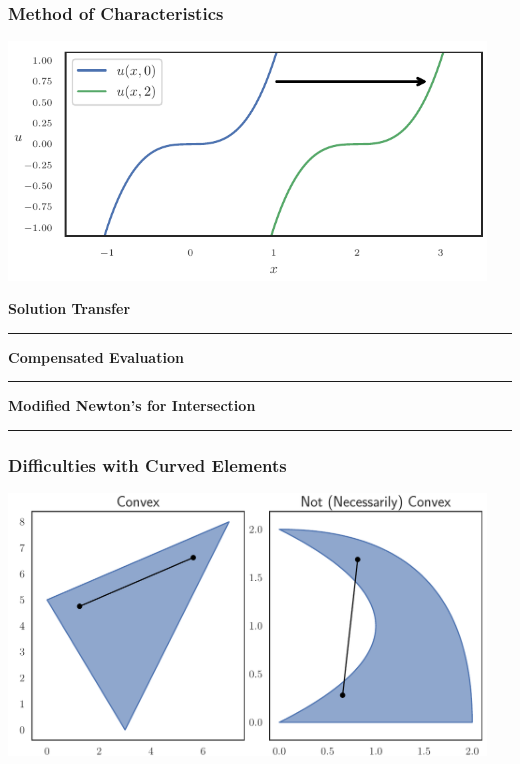 \documentclass{beamer}
\begin{document}
\begin{frame}
\frametitle{Method of Characteristics}
\begin{center}
\includegraphics[width=0.95\textwidth]
                {../images/solution-transfer/simple_transport.pdf}
\end{center}
\end{frame}


\begin{frame}
\centering
{\Large \bf Solution Transfer}
\rule{0.82\textwidth}{1pt}
\end{frame}


\begin{frame}
\centering
{\Large \bf Compensated Evaluation}
\rule{0.82\textwidth}{1pt}
\end{frame}


\begin{frame}
\centering
{\Large \bf Modified Newton's for Intersection}
\rule{0.82\textwidth}{1pt}
\end{frame}

\begin{frame}
\frametitle{Difficulties with Curved Elements}
\begin{center}
\includegraphics[width=0.95\textwidth]
                {../images/slides/not_convex.pdf}
\end{center}
\end{frame}
\end{document}
